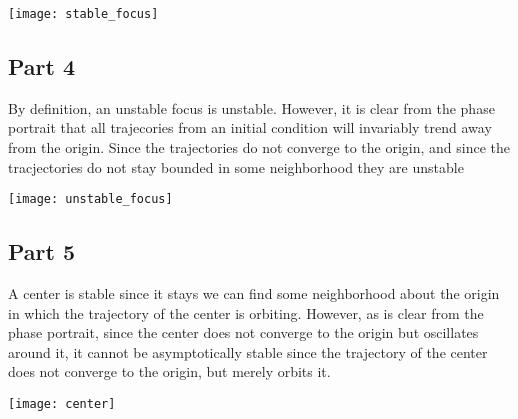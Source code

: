 \begin{center}
  \texttt{[image: stable\_focus]}
\end{center}

\subsection*{Part 4}
By definition, an unstable focus is unstable. However, it is clear from the phase portrait that all trajecories from an initial condition will invariably trend away from the origin. Since the trajectories do not converge to the origin, and since the tracjectories do not stay bounded in some neighborhood they are unstable

\begin{center}
  \texttt{[image: unstable\_focus]}
\end{center}

\subsection*{Part 5}
A center is stable since it stays we can find some neighborhood about the origin in which the trajectory of the center is orbiting. However, as is clear from the phase portrait, since the center does not converge to the origin but oscillates around it, it cannot be asymptotically stable since the trajectory of the center does not converge to the origin, but merely orbits it.

\begin{center}
  \texttt{[image: center]}
\end{center}
